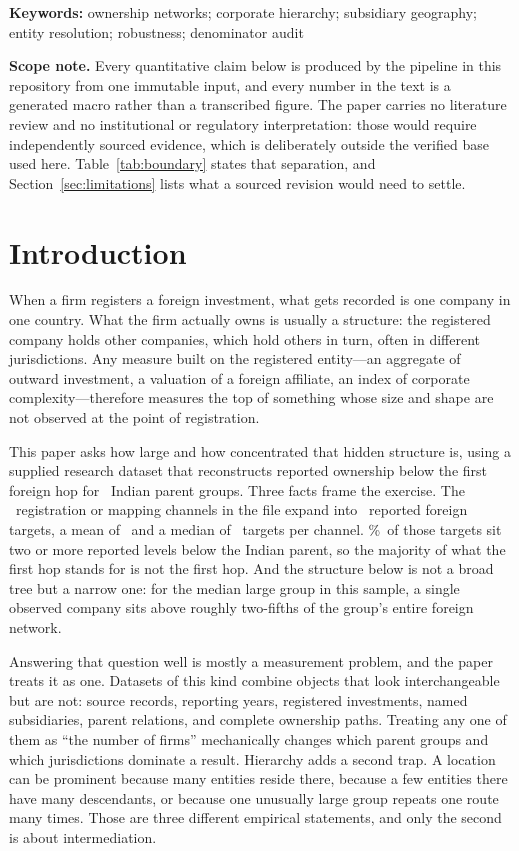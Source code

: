 \documentclass[11pt]{article}
\newcommand{\pct}{\%}
\begin{document}
\noindent\textbf{Keywords:} ownership networks; corporate hierarchy;
subsidiary geography; entity resolution; robustness; denominator audit

\vspace{0.8em}
\noindent\textbf{Scope note.} Every quantitative claim below is produced by the
pipeline in this repository from one immutable input, and every number in the
text is a generated macro rather than a transcribed figure. The paper carries no
literature review and no institutional or regulatory interpretation: those would
require independently sourced evidence, which is deliberately outside the
verified base used here. Table~\ref{tab:boundary} states that separation, and
Section~\ref{sec:limitations} lists what a sourced revision would need to
settle.

\tableofcontents
\newpage

\section{Introduction}

When a firm registers a foreign investment, what gets recorded is one company
in one country. What the firm actually owns is usually a structure: the
registered company holds other companies, which hold others in turn, often in
different jurisdictions. Any measure built on the registered entity---an
aggregate of outward investment, a valuation of a foreign affiliate, an index
of corporate complexity---therefore measures the top of something whose size
and shape are not observed at the point of registration.

This paper asks how large and how concentrated that hidden structure is, using
a supplied research dataset that reconstructs reported ownership below the
first foreign hop for \Parents\ Indian parent groups. Three facts frame the
exercise. The \UINs\ registration or mapping channels in the file expand into
\Targets\ reported foreign targets, a mean of \TargetsPerUinMean\ and a median
of \TargetsPerUinMedian\ targets per channel. \DepthTwoPlusPct\pct\ of those
targets sit two or more reported levels below the Indian parent, so the
majority of what the first hop stands for is not the first hop. And the
structure below is not a broad tree but a narrow one: for the median large
group in this sample, a single observed company sits above roughly two-fifths
of the group's entire foreign network.

Answering that question well is mostly a measurement problem, and the paper
treats it as one. Datasets of this kind combine objects that look
interchangeable but are not: source records, reporting years, registered
investments, named subsidiaries, parent relations, and complete ownership
paths. Treating any one of them as ``the number of firms'' mechanically changes
which parent groups and which jurisdictions dominate a result. Hierarchy adds a
second trap. A location can be prominent because many entities reside there,
because a few entities there have many descendants, or because one unusually
large group repeats one route many times. Those are three different empirical
statements, and only the second is about intermediation.
\end{document}
